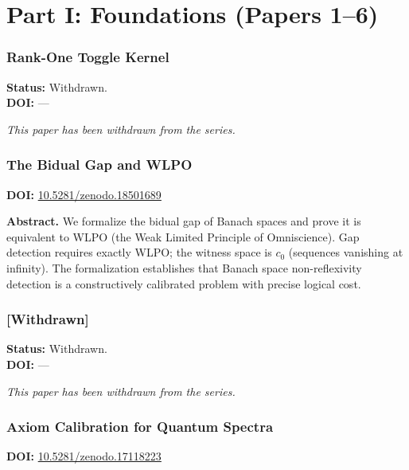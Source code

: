 \documentclass[11pt,a4paper]{article}
\begin{document}
\newpage

\part*{Part I: Foundations (Papers 1--6)}

\setcounter{section}{0}
\section{Rank-One Toggle Kernel}
\label{sec:p1}
\textbf{Status:} Withdrawn.\\
\textbf{DOI:} ---

\bigskip
\noindent\textit{This paper has been withdrawn from the series.}

\section{The Bidual Gap and WLPO}
\label{sec:p2}
\textbf{DOI:} \href{https://doi.org/10.5281/zenodo.18501689}{10.5281/zenodo.18501689}

\bigskip
\noindent\textbf{Abstract.}
We formalize the bidual gap of Banach spaces and prove it is equivalent to WLPO (the Weak Limited Principle of Omniscience). Gap detection requires exactly WLPO; the witness space is $c_0$ (sequences vanishing at infinity). The formalization establishes that Banach space non-reflexivity detection is a constructively calibrated problem with precise logical cost.

\section{[Withdrawn]}
\label{sec:p3}
\textbf{Status:} Withdrawn.\\
\textbf{DOI:} ---

\bigskip
\noindent\textit{This paper has been withdrawn from the series.}

\section{Axiom Calibration for Quantum Spectra}
\label{sec:p4}
\textbf{DOI:} \href{https://doi.org/10.5281/zenodo.17118223}{10.5281/zenodo.17118223}
\end{document}
